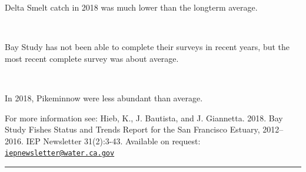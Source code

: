 \documentclass[
]{book}
\begin{document}
\begin{panel-grid}
\begin{columns-nocenter}
\begin{column800}
\begin{expand}
\end{expand}

\end{column800}

\end{columns-nocenter}

\begin{columns-nocenter}

\begin{column800}

Delta Smelt catch in 2018 was much lower than the longterm average.

\end{column800}

\begin{column40}

~

\end{column40}

\begin{column800}

Bay Study has not been able to complete their surveys in recent years, but the most recent complete survey was about average.

\end{column800}

\begin{column40}

~

\end{column40}

\begin{column800}

In 2018, Pikeminnow were less abundant than average.

\end{column800}

\end{columns-nocenter}

\end{panel-grid}

\begin{disclaimer}
For more information see: Hieb, K., J. Bautista, and J. Giannetta. 2018.
Bay Study Fishes Status and Trends Report for the San Francisco Estuary,
2012--2016. IEP Newsletter 31(2):3-43. Available on request:
\href{mailto:iepnewsletter@water.ca.gov}{\nolinkurl{iepnewsletter@water.ca.gov}}
\end{disclaimer}

\begin{center}\rule{0.5\linewidth}{0.5pt}\end{center}
\end{document}
